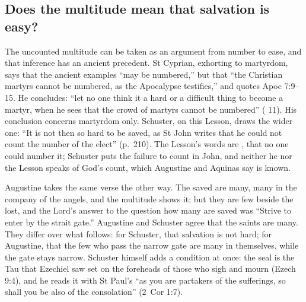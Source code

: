 \subsection{Does the multitude mean that salvation is easy?}
\label{sec:sealed-difficulty}

The uncounted multitude can be taken as an argument from number to ease, and
that inference has an ancient precedent. St Cyprian, exhorting to martyrdom,
says that the ancient examples ``may be numbered,'' but that ``the Christian
martyrs cannot be numbered, as the Apocalypse testifies,'' and quotes Apoc
7:9--15. He concludes: ``let no one think it a hard or a difficult thing to
become a martyr, when he sees that the crowd of martyrs cannot be numbered''
( 11). His conclusion concerns martyrdom only. Schuster,
on this Lesson, draws the wider one: ``It is not then so hard to be saved, as
St John writes that he could not count the number of the elect'' (p.~210).
The Lesson's words are , that no one could
number it; Schuster puts the failure to count in John, and neither he nor the
Lesson speaks of God's count, which Augustine and Aquinas say is known.

Augustine takes the same verse the other way. The saved are many, many in the
company of the angels, and the multitude shows it; but they are few beside the
lost, and the Lord's answer to the question how many are saved was ``Strive to
enter by the strait gate.'' Augustine and Schuster agree that the saints are
many. They differ over what follows: for Schuster, that salvation is not hard;
for Augustine, that the few who pass the narrow gate are many in themselves,
while the gate stays narrow. Schuster himself adds a condition at once: the
seal is the Tau that Ezechiel saw set on the foreheads of those who sigh and
mourn (Ezech 9:4), and he reads it with St Paul's ``as you are partakers of
the sufferings, so shall you be also of the consolation'' (2~Cor 1:7).

